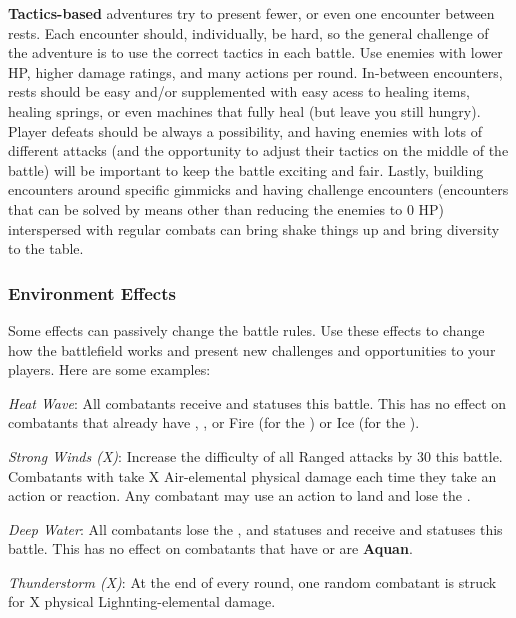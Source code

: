 \begin{multicols}{2}
\textbf{Tactics-based} adventures try to present fewer, or even one encounter between rests. Each encounter should, individually, be hard, so the general challenge of the adventure is to use the correct tactics in each battle. Use enemies with lower HP, higher damage ratings, and many actions per round. In-between encounters, rests should be easy and/or supplemented with easy acess to healing items, healing springs, or even machines that fully heal (but leave you still hungry). Player defeats should be always a possibility, and having enemies with lots of different attacks (and the opportunity to adjust their tactics on the middle of the battle) will be important to keep the battle exciting and fair. Lastly, building encounters around specific gimmicks and having challenge encounters (encounters that can be solved by means other than reducing the enemies to 0 HP) interspersed with regular combats can bring shake things up and bring diversity to the table.  

\subsubsection{Environment Effects}\label{gm-enveffct}
Some effects can passively change the battle rules. Use these effects to change how the battlefield works and present new challenges and opportunities to your players. Here are some examples:

\textit{Heat Wave}: All combatants receive  and  statuses this battle. This has no effect on combatants that already have , ,  or  Fire (for the ) or Ice (for the ). 

\textit{Strong Winds (X)}: Increase the difficulty of all Ranged attacks by 30 this battle. Combatants with  take X Air-elemental physical damage each time they take an action or reaction. Any combatant may use an action to land and lose the . 

\textit{Deep Water}: All combatants lose the ,  and  statuses and receive  and  statuses this battle. This has no effect on combatants that have  or are \textbf{Aquan}. 

\textit{Thunderstorm (X)}: At the end of every round, one random combatant is struck for X physical Lighnting-elemental damage.


\end{multicols}
